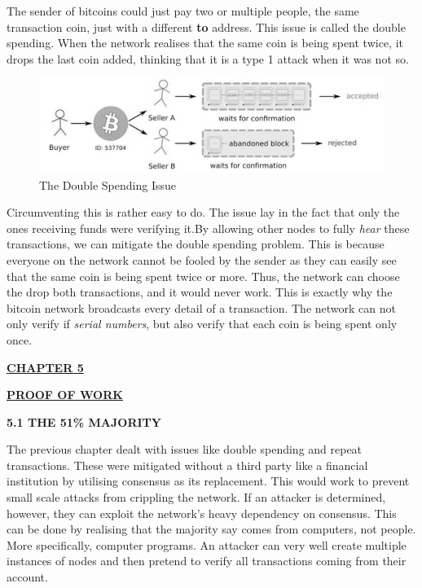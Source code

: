 \documentclass[12pt,a4paper]{report}
\begin{document}
\begin{justify}
The sender of bitcoins could just pay two or multiple people, the same transaction coin, just with a different \textbf{to} address. This issue is called the double spending.
When the network realises that the same coin is being spent twice, it drops the last coin added, thinking that it is a type 1 attack when it was not so.
\vspace{10mm}
\begin{figure}[h]
\centering
\caption{The Double Spending Issue \cite{coins}}
\includegraphics[scale=0.5]{pics/double_spending.jpg}
\end{figure}
\vspace{10mm}

Circumventing this is rather easy to do. The issue lay in the fact that only the ones receiving funds were verifying it.By allowing other nodes to fully \textit{hear} these transactions, we can mitigate the double spending problem. This is because everyone on the network cannot be fooled by the sender as they can easily see that the same coin is being spent twice or more. Thus, the network can choose the drop both transactions, and it would never work.\newline
This is exactly why the bitcoin network broadcasts every detail of a transaction. The network can not only verify if \textit{serial numbers}, but also verify that each coin is being spent only once.

\newpage
\begin{center}\underline{  \Large\textbf{CHAPTER 5}}\end{center}
\begin{center}\underline{ \Large \textbf{PROOF OF WORK}}\end{center}
\vspace{10mm}

\textbf{5.1 THE 51\% MAJORITY}
\vspace{10mm}

The previous chapter dealt with issues like double spending and repeat transactions. These were mitigated without a third party like a financial institution by utilising consensus as its replacement. This would work to prevent small scale attacks from crippling the network.\newline
If an attacker is determined, however, they can exploit the network's heavy dependency on consensus. This can be done by realising that the majority say comes from computers, not people. More specifically, computer programs. An attacker can very well create multiple instances of nodes and then pretend to verify all transactions coming from their account. 
\vspace{10mm}


\end{justify}
\end{document}

